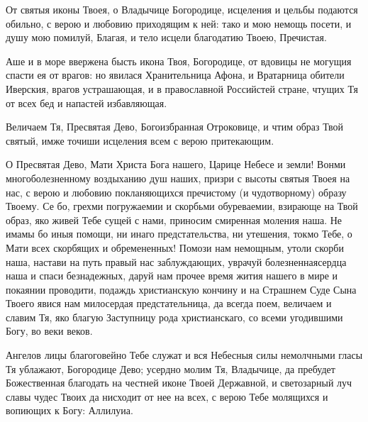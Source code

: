 
\vspace{-\baselineskip}
 



От святыя иконы Твоея, о Владычице Богородице, исцеления и цельбы подаются обильно, с верою и любовию приходящим к ней: тако и мою немощь посети, и душу мою помилуй, Благая, и тело исцели благодатию Твоею, Пречистая.




Аше и в море ввержена бысть икона Твоя, Богородице, от вдовицы не могущия спасти ея от врагов: но явилася Хранительница Афона, и Вратарница обители Иверския, врагов устрашающая, и в православной Российстей стране, чтущих Тя от всех бед и напастей избавляющая.




Величаем Тя, Пресвятая Дево, Богоизбранная Отроковице, и чтим образ Твой святый, имже точиши исцеления всем с верою притекающим.



\longpage[3]


О Пресвятая Дево, Мати Христа Бога нашего, Царице Небесе и земли! Вонми многоболезненному воздыханию душ наших, призри с высоты святыя Твоея на нас, с верою и любовию покланяющихся пречистому (и чудотворному) образу Твоему. Се бо, грехми погружаемии и скорбьми обуреваемии, взирающе на Твой образ, яко живей Тебе сущей с нами, приносим смиренная моления наша. Не имамы бо иныя помощи, ни инаго предстательства, ни утешения, токмо Тебе, о Мати всех скорбящих и обремененных! Помози нам немощным, утоли скорби наша, настави на путь правый нас заблуждающих, уврачуй болезненнаясердца наша и спаси безнадежных, даруй нам прочее время жития нашего в мире и покаянии проводити, подаждь христианскую кончину и на Страшнем Суде Сына Твоего явися нам милосердая предстательница, да всегда поем, величаем и славим Тя, яко благую Заступницу рода христианскаго, со всеми угодившими Богу, во веки веков.
\mychapterending




Ангелов лицы благоговейно Тебе служат и вся Небесныя силы немолчными гласы Тя ублажают, Богородице Дево; усердно молим Тя, Владычице, да пребудет Божественная благодать на честней иконе Твоей Державной, и светозарный луч славы чудес Твоих да нисходит от нее на всех, с верою Тебе молящихся и вопиющих к Богу: Аллилуиа.


